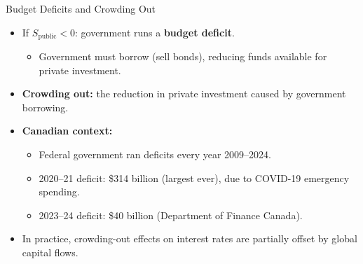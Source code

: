 \documentclass[aspectratio=169]{beamer}
\begin{document}
\begin{frame}{Budget Deficits and Crowding Out}
\transfade
\begin{itemize}
  \item If $S_{\text{public}} < 0$: government runs a \textbf{budget deficit}.
  \begin{itemize}
    \item Government must borrow (sell bonds), reducing funds available for private investment.
  \end{itemize}
  \item \textbf{Crowding out:} the reduction in private investment caused by government borrowing.
  \item \textbf{Canadian context:}
  \begin{itemize}
    \item Federal government ran deficits every year 2009--2024.
    \item 2020--21 deficit: \alert{\$314 billion} (largest ever), due to COVID-19 emergency spending.
    \item 2023--24 deficit: \$40 billion (Department of Finance Canada).
  \end{itemize}
  \item In practice, crowding-out effects on interest rates are partially offset by global capital flows.
\end{itemize}
\end{frame}

\end{document}
